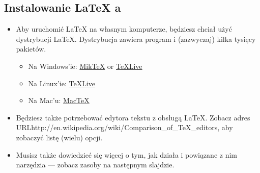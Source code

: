 \documentclass{beamer}
\begin{document}
\subsection{Instalowanie \LaTeX{} a}
\begin{frame}{\insertsubsection}
\begin{itemize}
\item Aby uruchomić \LaTeX{} na własnym komputerze, będziesz chciał użyć dystrybucji \LaTeX{}. Dystrybucja zawiera program  i (zazwyczaj) kilka tysięcy pakietów.
\begin{itemize}
\item Na Windows'ie: \href{http://miktex.org/}{Mik\TeX} or \href{http://tug.org/texlive/}{\TeX Live}
\item Na Linux'ie: \href{http://tug.org/texlive/}{\TeX Live}
\item Na Mac'u: \href{http://tug.org/mactex/}{Mac\TeX}
\end{itemize}
\item Będziesz także potrzebować edytora tekstu z obsługą \LaTeX{}. Zobacz adres URL{http://en.wikipedia.org/wiki/Comparison\_of\_TeX\_editors}, aby zobaczyć listę (wielu) opcji.
\item Musisz także dowiedzieć się więcej o tym, jak działa  i powiązane z nim narzędzia --- zobacz zasoby na następnym slajdzie.
\end{itemize}
\end{frame}

\end{document}
